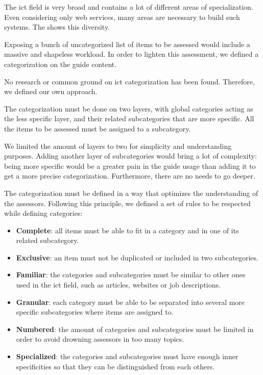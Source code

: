 The \gls{ict} field is very broad and contains a lot of different areas of specialization. Even considering only web services, many areas are necessary to build such systems. The  shows this diversity.

Exposing a bunch of uncategorized list of items to be assessed would include a massive and shapeless workload. In order to lighten this assessment, we defined a categorization on the guide content.

No research or common ground on \gls{ict} categorization has been found. Therefore, we defined our own approach.

The categorization must be done on two layers, with global categories acting as the less specific layer, and their related subcategories that are more specific. All the items to be assessed must be assigned to a subcategory.

We limited the amount of layers to two for simplicity and understanding purposes. Adding another layer of subcategories would bring a lot of complexity: being more specific would be a greater pain in the guide usage than adding it to get a more precise categorization. Furthermore, there are no needs to go deeper.

The categorization must be defined in a way that optimizes the understanding of the assessors. Following this principle, we defined a set of rules to be respected while defining categories:
\begin{itemize}
    \item \textbf{Complete}: all items must be able to fit in a category and in one of its related subcategory.
    \item \textbf{Exclusive}: an item must not be duplicated or included in two subcategories.
    \item \textbf{Familiar}: the categories and subcategories must be similar to other ones used in the \gls{ict} field, such as articles, websites or job descriptions.
    \item \textbf{Granular}: each category must be able to be separated into several more specific subcategories where items are assigned to. 
    \item \textbf{Numbered}: the amount of categories and subcategories must be limited in order to avoid drowning assessors in too many topics.
    \item \textbf{Specialized}: the categories and subcategories must have enough inner specificities so that they can be distinguished from each others. 
\end{itemize}

